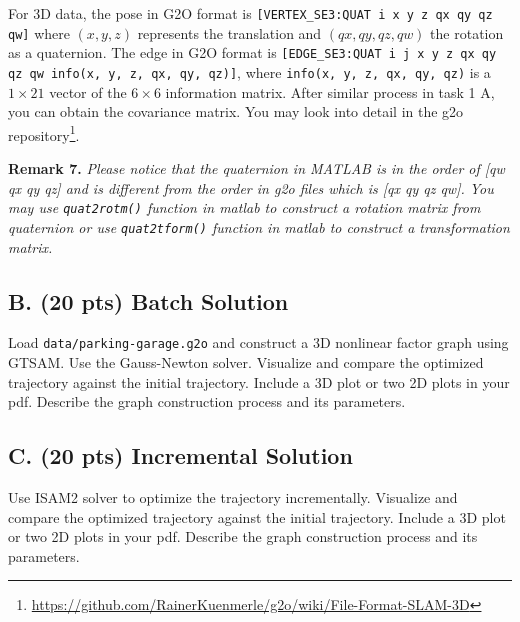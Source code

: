 \documentclass[tp]{lcc}
\begin{document}
For 3D data, the pose in G2O format is \texttt{[VERTEX\_SE3:QUAT i x y z qx qy qz qw]} where $(x,y,z)$ represents the translation and $(qx,qy,qz,qw)$ the rotation as a quaternion. The edge in G2O format is \texttt{[EDGE\_SE3:QUAT i j x y z qx qy qz qw info(x, y, z, qx, qy, qz)]}, where \texttt{info(x, y, z, qx, qy, qz)} is a $1 \times 21$ vector of the $6 \times 6$ information matrix. After similar process in task 1 A, you can obtain the covariance matrix. You may look into detail in the g2o repository\footnote{\url{https://github.com/RainerKuenmerle/g2o/wiki/File-Format-SLAM-3D}}.

\textbf{Remark 7.} \textit{Please notice that the quaternion in MATLAB is in the order of [qw qx qy qz] and is different from the order in g2o files which is [qx qy qz qw]. You may use \texttt{quat2rotm()} function in matlab to construct a rotation matrix from quaternion or use \texttt{quat2tform()} function in matlab to construct a transformation matrix.}

\subsection{B. (20 pts) Batch Solution}
Load \texttt{data/parking-garage.g2o} and construct a 3D nonlinear factor graph using GTSAM. Use the Gauss-Newton solver. Visualize and compare the optimized trajectory against the initial trajectory. Include a 3D plot or two 2D plots in your pdf. Describe the graph construction process and its parameters.

\subsection{C. (20 pts) Incremental Solution}
Use ISAM2 solver to optimize the trajectory incrementally. Visualize and compare the optimized trajectory against the initial trajectory. Include a 3D plot or two 2D plots in your pdf. Describe the graph construction process and its parameters.




\end{document}
